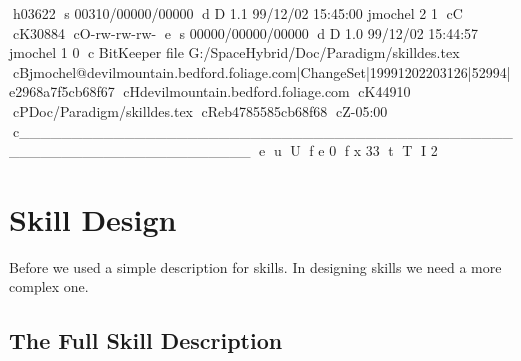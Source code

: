 h03622
s 00310/00000/00000
d D 1.1 99/12/02 15:45:00 jmochel 2 1
cC
cK30884
cO-rw-rw-rw-
e
s 00000/00000/00000
d D 1.0 99/12/02 15:44:57 jmochel 1 0
c BitKeeper file G:/SpaceHybrid/Doc/Paradigm/skilldes.tex
cBjmochel@devilmountain.bedford.foliage.com|ChangeSet|19991202203126|52994|e2968a7f5cb68f67
cHdevilmountain.bedford.foliage.com
cK44910
cPDoc/Paradigm/skilldes.tex
cReb4785585cb68f68
cZ-05:00
c______________________________________________________________________
e
u
U
f e 0
f x 33
t
T
I 2
\chapter{Skill Design}

Before we used a simple description for skills. In designing skills we need
a more complex one.

\section{The Full Skill Description}
\small


